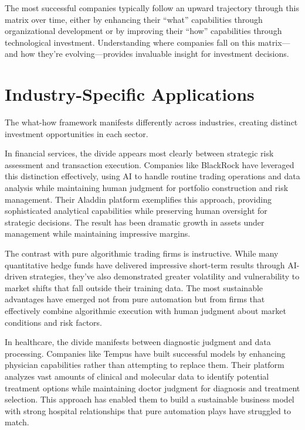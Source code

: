 \documentclass[
  Letterpaper,
]{scrbook}
\begin{document}
The most successful companies typically follow an upward trajectory
through this matrix over time, either by enhancing their ``what''
capabilities through organizational development or by improving their
``how'' capabilities through technological investment. Understanding
where companies fall on this matrix---and how they're
evolving---provides invaluable insight for investment decisions.

\section{Industry-Specific
Applications}\label{industry-specific-applications}

The what-how framework manifests differently across industries, creating
distinct investment opportunities in each sector.

In financial services, the divide appears most clearly between strategic
risk assessment and transaction execution. Companies like BlackRock have
leveraged this distinction effectively, using AI to handle routine
trading operations and data analysis while maintaining human judgment
for portfolio construction and risk management. Their Aladdin platform
exemplifies this approach, providing sophisticated analytical
capabilities while preserving human oversight for strategic decisions.
The result has been dramatic growth in assets under management while
maintaining impressive margins.

The contrast with pure algorithmic trading firms is instructive. While
many quantitative hedge funds have delivered impressive short-term
results through AI-driven strategies, they've also demonstrated greater
volatility and vulnerability to market shifts that fall outside their
training data. The most sustainable
advantages have emerged not from pure automation but from firms that
effectively combine algorithmic execution with human judgment about
market conditions and risk factors.

In healthcare, the divide manifests between diagnostic judgment and data
processing. Companies like Tempus have built successful models by
enhancing physician capabilities rather than attempting to replace them.
Their platform analyzes vast amounts of clinical and molecular data to
identify potential treatment options while maintaining doctor judgment
for diagnosis and treatment selection. This approach has enabled them to
build a sustainable business model with strong hospital relationships
that pure automation plays have struggled to match.
\end{document}
